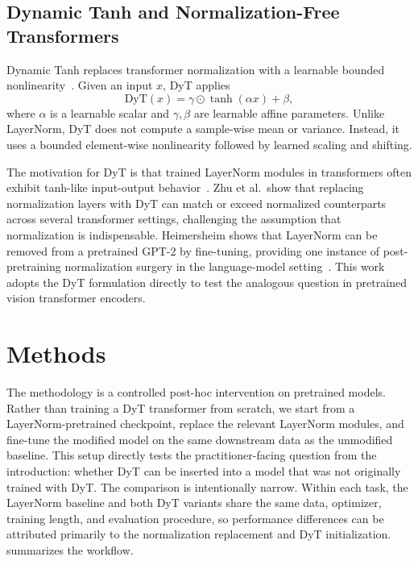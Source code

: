 \documentclass[10pt,twocolumn,letterpaper]{article}
\newcommand{\dyt}{\mathrm{DyT}}
\begin{document}
\subsection{Dynamic Tanh and Normalization-Free Transformers}

Dynamic Tanh replaces transformer normalization with a learnable bounded nonlinearity~\cite{zhu2025dyt}. Given an input $x$, DyT applies
\begin{equation}
    \dyt(x) = \gamma \odot \tanh(\alpha x) + \beta,
    \label{eq:dyt}
\end{equation}
where $\alpha$ is a learnable scalar and $\gamma, \beta$ are learnable affine parameters. Unlike LayerNorm, DyT does not compute a sample-wise mean or variance. Instead, it uses a bounded element-wise nonlinearity followed by learned scaling and shifting.

The motivation for DyT is that trained LayerNorm modules in transformers often exhibit tanh-like input-output behavior~\cite{zhu2025dyt}. Zhu et al.\ show that replacing normalization layers with DyT can match or exceed normalized counterparts across several transformer settings, challenging the assumption that normalization is indispensable. Heimersheim shows that LayerNorm can be removed from a pretrained GPT-2 by fine-tuning, providing one instance of post-pretraining normalization surgery in the language-model setting~\cite{heimersheim2024remove}. This work adopts the DyT formulation directly to test the analogous question in pretrained vision transformer encoders.

\section{Methods}
\label{sec:method}

The methodology is a controlled post-hoc intervention on pretrained models. Rather than training a DyT transformer from scratch, we start from a LayerNorm-pretrained checkpoint, replace the relevant LayerNorm modules, and fine-tune the modified model on the same downstream data as the unmodified baseline. This setup directly tests the practitioner-facing question from the introduction: whether DyT can be inserted into a model that was not originally trained with DyT. The comparison is intentionally narrow. Within each task, the LayerNorm baseline and both DyT variants share the same data, optimizer, training length, and evaluation procedure, so performance differences can be attributed primarily to the normalization replacement and DyT initialization.  summarizes the workflow.
\end{document}
